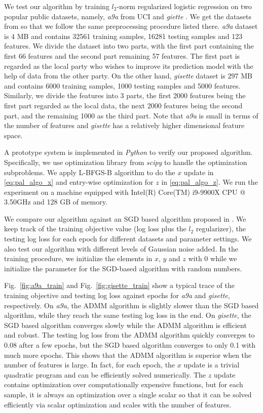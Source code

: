 We test our algorithm by training $l_2$-norm regularized logistic regression on two popular public datasets, namely, \emph{a9a} from UCI \cite{Dua:2019} and \emph{giette} \cite{guyon2005result}. We get the datasets from \cite{Liblinear:2019} so that we follow the same preprocessing procedure listed there. \emph{a9a} dataset is $4$ MB and contains 32561 training samples, 16281 testing samples and 123 features. We divide the dataset into two parts, with the first part containing the first 66 features and the second part remaining 57 features. The first part is regarded as the local party who wishes to improve its prediction model with the help of data from the other party. On the other hand, \emph{gisette} dataset is $297$ MB and contains 6000 training samples, 1000 testing samples and 5000 features. Similarly, we divide the features into 3 parts, the first 2000 features being the first part regarded as the local data, the next 2000 features being the second part, and the remaining 1000 as the third part. Note that \emph{a9a} is small in terms of the number of features and \emph{gisette} has a relatively higher dimensional feature space.

A prototype system is implemented in \emph{Python} to verify our proposed algorithm. Specifically, we use optimization library from \emph{scipy} to handle the optimization subproblems. We apply L-BFGS-B algorithm to do the $x$ update in \eqref{eq:pal_algo_x} and entry-wise optimization for $z$ in \eqref{eq:pal_algo_z}. We run the experiment on a machine equipped with Intel(R) Core(TM) i9-9900X CPU @ 3.50GHz and 128 GB of memory. 

We compare our algorithm against an SGD based algorithm proposed in \cite{hu2019fdml}.
We keep track of the training objective value (log loss plus the $l_2$ regularizer), the testing log loss for each epoch for different datasets and parameter settings. We also test our algorithm with different levels of Gaussian noise added. In the training procedure, we initialize the elements in $x$, $y$ and $z$ with $0$ while we initialize the parameter for the SGD-based algorithm with random numbers.

Fig.~\ref{fig:a9a_train} and Fig.~\ref{fig:gisette_train} show a typical trace of the training objective and testing log loss against epochs for \emph{a9a} and \emph{gisette}, respectively. On \emph{a9a}, the ADMM algorithm is slightly slower than the SGD based algorithm, while they reach the same testing log loss in the end. On \emph{gisette}, the SGD based algorithm converges slowly while the ADMM algorithm is efficient and robust. The testing log loss from the ADMM algorithm quickly converges to 0.08 after a few epochs, but the SGD based algorithm converges to only 0.1 with much more epochs. This shows that the ADMM algorithm is superior when the number of features is large. In fact, for each epoch, the $x$ update is a trivial quadratic program and can be efficiently solved numerically. The $z$ update contains optimization over computationally expensive functions, but for each sample, it is always an optimization over a single scalar so that it can be solved efficiently via scalar optimization and scales with the number of features.

